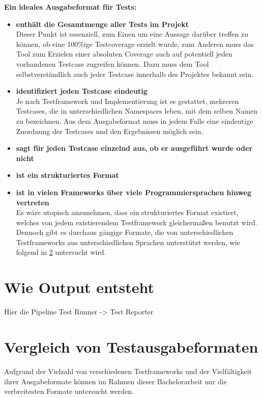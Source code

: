 \textbf{Ein ideales Ausgabeformat für Tests:}
\begin{itemize}
    \item \textbf{enthält die Gesamtmenge aller Tests im Projekt}\\
    Dieser Punkt ist essenziell, zum Einen um eine Aussage darüber treffen zu können, ob eine 100\%ige Testcoverage erzielt wurde, zum Anderen muss das Tool zum Erzielen einer absoluten Coverage auch auf potentiell jeden vorhandenen Testcase zugreifen können. Dazu muss dem Tool selbstverständlich auch jeder Testcase innerhalb des Projektes bekannt sein.
    \item \textbf{identifiziert jeden Testcase eindeutig}\\
    Je nach Testframework und Implementierung ist es gestattet, mehreren Testcases, die in unterschiedlichen Namespaces leben, mit dem selben Namen zu bezeichnen. Aus dem Ausgabeformat muss in jedem Falle eine eindeutige Zuordnung der Testcases und den Ergebnissen möglich sein. 
    \item \textbf{sagt für jeden Testcase einzelnd aus, ob er ausgeführt wurde oder nicht}
    \item \textbf{ist ein strukturiertes Format}\\
    \item \textbf{ist in vielen Frameworks über viele Programmiersprachen hinweg vertreten}\\
    Es wäre utopisch anzunehmen, dass ein strukturiertes Format existiert, welches von jedem existierendem Testframework gleichermaßen benutzt wird. Dennoch gibt es durchaus gängige Formate, die von unterschiedlichen Testframeworks aus unterschiedlichen Sprachen unterstützt werden, wie folgend in \ref{Vergleich Testausgabefomate} untersucht wird. 
\end{itemize}

\section{Wie Output entsteht}
Hier die Pipeline Test Runner -> Test Reporter



\section{Vergleich von Testausgabeformaten}\label{Vergleich Testausgabefomate}
Aufgrund der Vielzahl von verschiedenen Testframeworks und der Vielfältigkeit ihrer Ausgabeformate können im Rahmen dieser Bachelorarbeit nur die verbreitesten Formate untersucht werden.

